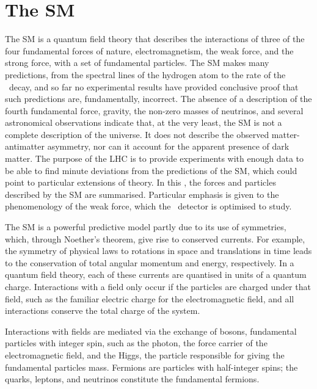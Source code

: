 \chapter{The \acl{SM}}
\label{chap:intro:sm}


The \acf{SM} is a quantum field theory that describes the interactions of three 
of the four fundamental forces of nature, electromagnetism, the weak force, and 
the strong force, with a set of fundamental particles.
The \ac{SM} makes many predictions, from the spectral lines of the hydrogen  
atom to the rate of the \BsTomumu\ decay, and so far no experimental results 
have provided conclusive proof that such predictions are, fundamentally, 
incorrect.
The absence of a description of the fourth fundamental force, gravity, the 
non-zero masses of neutrinos, and several astronomical observations indicate 
that, at the very least, the \ac{SM} is not a complete description of the 
universe.
It does not describe the observed matter-antimatter asymmetry, nor can it 
account for the apparent presence of dark matter.
The purpose of the \ac{LHC} is to provide experiments with enough data to be 
able to find minute deviations from the predictions of the \ac{SM}, which could 
point to particular extensions of theory.
In this , the forces and particles described by the 
\ac{SM} are summarised.
Particular emphasis is given to the phenomenology of the weak force, which the 
\lhcb\ detector is optimised to study.

The \ac{SM} is a powerful predictive model partly due to its use of symmetries, 
which, through Noether's theorem, give rise to conserved currents.
For example, the symmetry of physical laws to rotations in space and 
translations in time leads to the conservation of total angular momentum and 
energy, respectively.
In a quantum field theory, each of these currents are quantised in units of a 
quantum charge.
Interactions with a field only occur if the particles are charged under that 
field, such as the familiar electric charge for the electromagnetic field, and 
all interactions conserve the total charge of the system.

Interactions with fields are mediated via the exchange of bosons, fundamental 
particles with integer spin, such as the photon, the force carrier of the 
electromagnetic field, and the Higgs, the particle responsible for giving the 
fundamental particles mass.
Fermions are particles with half-integer spins; the quarks, leptons, and 
neutrinos constitute the fundamental fermions.

